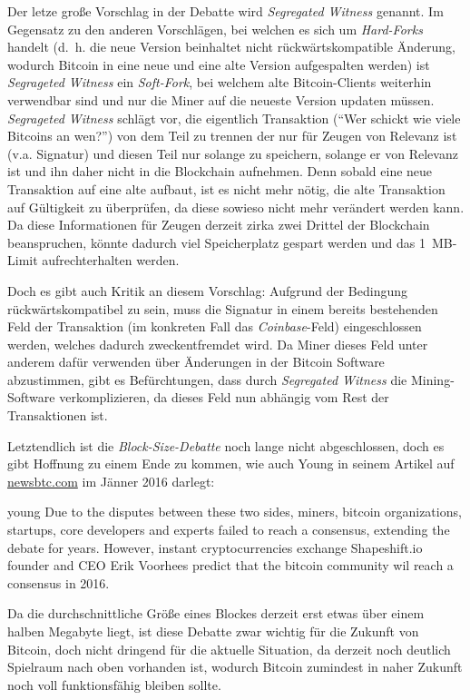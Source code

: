 Der letze große Vorschlag in der Debatte wird \emph{Segregated Witness} genannt.
Im Gegensatz zu den anderen Vorschlägen, bei welchen es sich um \emph{Hard-Forks} handelt (d.~h. die neue Version beinhaltet nicht rückwärtskompatible Änderung, wodurch Bitcoin in eine neue und eine alte Version aufgespalten werden) ist \emph{Segrageted Witness} ein \emph{Soft-Fork}, bei welchem alte Bitcoin-Clients weiterhin verwendbar sind und nur die Miner auf die neueste Version updaten müssen.
\emph{Segrageted Witness} schlägt vor, die eigentlich Transaktion ("`Wer schickt wie viele Bitcoins an wen?"') von dem Teil zu trennen der nur für Zeugen von Relevanz ist (v.a. Signatur) und diesen Teil nur solange zu speichern, solange er von Relevanz ist und ihn daher nicht in die Blockchain aufnehmen.
Denn sobald eine neue Transaktion auf eine alte aufbaut, ist es nicht mehr nötig, die alte Transaktion auf Gültigkeit zu überprüfen, da diese sowieso nicht mehr verändert werden kann.
Da diese Informationen für Zeugen derzeit zirka zwei Drittel der Blockchain beanspruchen, könnte dadurch viel Speicherplatz gespart werden und das 1~MB-Limit aufrechterhalten werden.

Doch es gibt auch Kritik an diesem Vorschlag:
Aufgrund der Bedingung rückwärtskompatibel zu sein, muss die Signatur in einem bereits bestehenden Feld der Transaktion (im konkreten Fall das \emph{Coinbase}-Feld) eingeschlossen werden, welches dadurch zweckentfremdet wird.
Da Miner dieses Feld unter anderem dafür verwenden über Änderungen in der Bitcoin Software abzustimmen, gibt es Befürchtungen, dass durch \emph{Segregated Witness} die Mining-Software verkomplizieren, da dieses Feld nun abhängig vom Rest der Transaktionen ist.

Letztendlich ist die \emph{Block-Size-Debatte} noch lange nicht abgeschlossen, doch es gibt Hoffnung zu einem Ende zu kommen, wie auch Young in seinem Artikel auf \url{newsbtc.com} im Jänner 2016 darlegt:

\begin{longquote}{young}
Due to the disputes between these two sides, miners, bitcoin organizations, startups, core developers and experts failed to reach a consensus, extending the debate for years.
However, instant cryptocurrencies exchange Shapeshift.io founder and CEO Erik Voorhees predict that the bitcoin community wil reach a consensus in 2016.
\end{longquote}

Da die durchschnittliche Größe eines Blockes derzeit erst etwas über einem halben Megabyte liegt, ist diese Debatte zwar wichtig für die Zukunft von Bitcoin, doch nicht dringend für die aktuelle Situation, da derzeit noch deutlich Spielraum nach oben vorhanden ist, wodurch Bitcoin zumindest in naher Zukunft noch voll funktionsfähig bleiben sollte.
